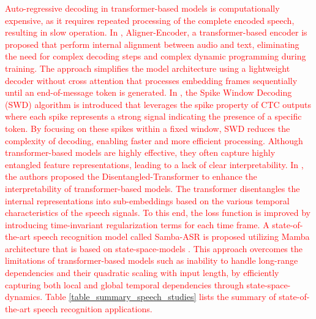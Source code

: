 \documentclass[preprint,12pt]{elsarticle}
\begin{document}
\textcolor{red}{Auto-regressive decoding in transformer-based models is computationally expensive, as it requires repeated processing of the complete encoded speech, resulting in slow operation. In \citep{stooke_aligner-encoders_2025}, Aligner-Encoder, a transformer-based encoder is proposed that perform internal alignment between audio and text, eliminating the need for complex decoding steps and complex dynamic programming during training. The approach simplifies the model architecture using a lightweight decoder without cross attention that processes embedding frames sequentially until an end-of-message token is generated. In \citep{zhang_breaking_2025}, the Spike Window Decoding (SWD) algorithm is introduced that leverages the spike property of CTC outputs where each spike represents a strong signal indicating the presence of a specific token. By focusing on these spikes within a fixed window, SWD reduces the complexity of decoding, enabling faster and more efficient processing. Although transformer-based models are highly effective, they often capture highly entangled feature representations, leading to a lack of clear interpretability. In \citep{wang_disentangled-transformer_2024}, the authors proposed the Disentangled-Transformer to enhance the interpretability of transformer-based models. The transformer disentangles the internal representations into sub-embeddings based on the various temporal characteristics of the speech signals. To this end, the loss function is improved by introducing time-invariant regularization terms for each time frame. A state-of-the-art speech recognition model called Samba-ASR is proposed utilizing Mamba architecture that is based on state-space-models \citep{shakhadri_samba-asr_2025}. This approach overcomes the limitations of transformer-based models such as inability to handle long-range dependencies and their quadratic scaling with input length, by efficiently capturing both local and global temporal dependencies through state-space-dynamics. Table \ref{table_summary_speech_studies} lists the summary of state-of-the-art speech recognition applications.}
\end{document}
